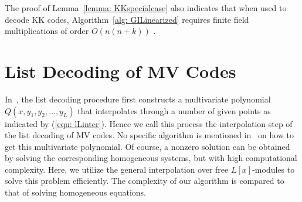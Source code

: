 \documentclass[11pt,onecolumn,draftcls]{IEEEtran}
\begin{document}
The proof of Lemma~\ref{lemma: KKspecialcase} also indicates that when used to decode KK codes,  Algorithm~\ref{alg: GILinearized} requires finite field multiplications of order $O(n(n+k))$ .

\section{List Decoding of MV Codes} \label{sec: generalMV}

In~\cite{mahdavifar_isit10}, the list decoding procedure first constructs a multivariate polynomial $Q(x, y_1, y_2,\ldots, y_L)$ that interpolates through a number of given points as indicated by (\ref{equ: lLinter}). Hence we call this process the interpolation step of the list decoding of MV codes. No specific algorithm is mentioned in~\cite{mahdavifar_isit10} on how to get this multivariate polynomial. Of course, a nonzero solution can be obtained by solving the corresponding homogeneous systems, but with high computational complexity. Here, we utilize the general interpolation over free $L[x]$-modules to solve this problem efficiently. The complexity of our algorithm is compared to that of  solving homogeneous equations.
\end{document}
